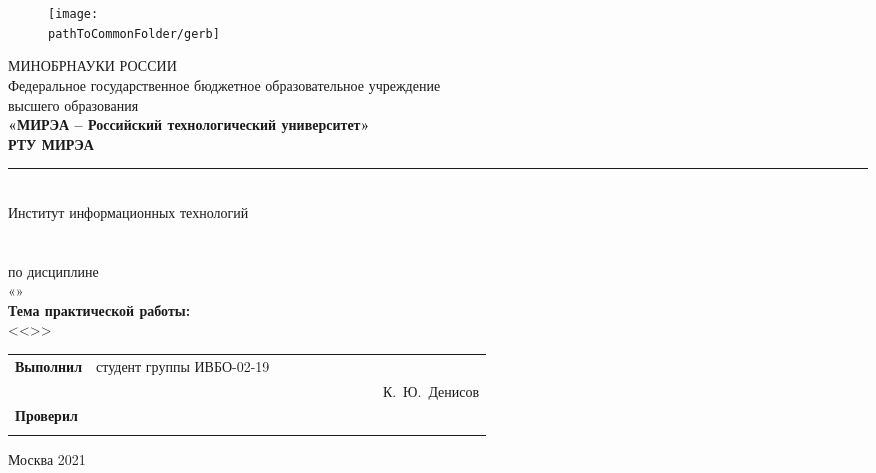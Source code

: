 
\begin{center}
	\begin{figure}[h!]
		\begin{center}
		\texttt{[image: \\pathToCommonFolder/gerb]}
		\end{center}	
	\end{figure}
 	\small	МИНОБРНАУКИ РОССИИ \\
	Федеральное государственное бюджетное образовательное учреждение\\
						высшего образования\\
\normalsize					
\textbf{«МИРЭА – Российский технологический университет»\\
						РТУ МИРЭА}\\
						\noindent\rule{1\linewidth}{2pt}\\
       Институт информационных технологий\\ %
					\kafedra\\
		\vspace{5ex}
			\large \textbf{\workname}  \\
		\vspace{2ex}
						по дисциплине\\ «\discipline» \\
		\vspace{3ex}
			\textbf{Тема практической работы:}\\ <<\theme>>
\vspace{6ex}
\small
\begin{table}[h!]
\begin{tabular}{lp{0.6\linewidth}l}
	\textbf{Выполнил} & студент группы ИВБО-02-19 & \\ 
	& & \hfill К.~Ю.~Денисов\\
	\textbf{Проверил} & \rang & \\
	& & \hfill \teacherfio\\
\end{tabular}
\end{table}

\normalsize
	
\vfill
Москва 2021

\end{center}